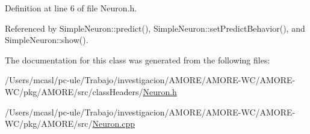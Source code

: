 Definition at line 6 of file Neuron.h.



Referenced by SimpleNeuron::predict(), SimpleNeuron::setPredictBehavior(), and SimpleNeuron::show().



The documentation for this class was generated from the following files:\begin{DoxyCompactItemize}
\item 
/Users/mcasl/pc-\/ule/Trabajo/investigacion/AMORE/AMORE-\/WC/AMORE-\/WC/pkg/AMORE/src/classHeaders/\hyperlink{_neuron_8h}{Neuron.h}\item 
/Users/mcasl/pc-\/ule/Trabajo/investigacion/AMORE/AMORE-\/WC/AMORE-\/WC/pkg/AMORE/src/\hyperlink{_neuron_8cpp}{Neuron.cpp}\end{DoxyCompactItemize}
